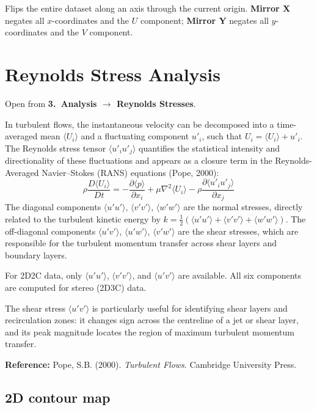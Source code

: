 \documentclass[11pt, a4paper]{report}
\newcommand{\uipth}[1]{\textbf{\textcolor{upblue}{#1}}}
\begin{document}
Flips the entire dataset along an axis through the current origin. \uipth{Mirror X} negates all $x$-coordinates and the $U$ component; \uipth{Mirror Y} negates all $y$-coordinates and the $V$ component.

\chapter{Reynolds Stress Analysis}
\label{ch:reynolds}

Open from \uipth{3.\ Analysis $\to$ Reynolds Stresses}.

In turbulent flows, the instantaneous velocity can be decomposed into a time-averaged mean $\langle U_i \rangle$ and a fluctuating component $u'_i$, such that $U_i = \langle U_i \rangle + u'_i$. The Reynolds stress tensor $\langle u'_i u'_j \rangle$ quantifies the statistical intensity and directionality of these fluctuations and appears as a closure term in the Reynolds-Averaged Navier--Stokes (RANS) equations (Pope, 2000):
\[
\rho \frac{D \langle U_i \rangle}{Dt} = -\frac{\partial \langle p \rangle}{\partial x_i} + \mu \nabla^2 \langle U_i \rangle - \rho \frac{\partial \langle u'_i u'_j \rangle}{\partial x_j}
\]
The diagonal components $\langle u'u' \rangle$, $\langle v'v' \rangle$, $\langle w'w' \rangle$ are the normal stresses, directly related to the turbulent kinetic energy by $k = \tfrac{1}{2}(\langle u'u'\rangle + \langle v'v'\rangle + \langle w'w'\rangle)$. The off-diagonal components $\langle u'v' \rangle$, $\langle u'w' \rangle$, $\langle v'w' \rangle$ are the shear stresses, which are responsible for the turbulent momentum transfer across shear layers and boundary layers.

For 2D2C data, only $\langle u'u' \rangle$, $\langle v'v' \rangle$, and $\langle u'v' \rangle$ are available. All six components are computed for stereo (2D3C) data.

\begin{tipbox}
The shear stress $\langle u'v' \rangle$ is particularly useful for identifying shear layers and recirculation zones: it changes sign across the centreline of a jet or shear layer, and its peak magnitude locates the region of maximum turbulent momentum transfer.
\end{tipbox}

\noindent\textbf{Reference:} Pope, S.B. (2000). \textit{Turbulent Flows}. Cambridge University Press.

\section{2D contour map}
\end{document}
